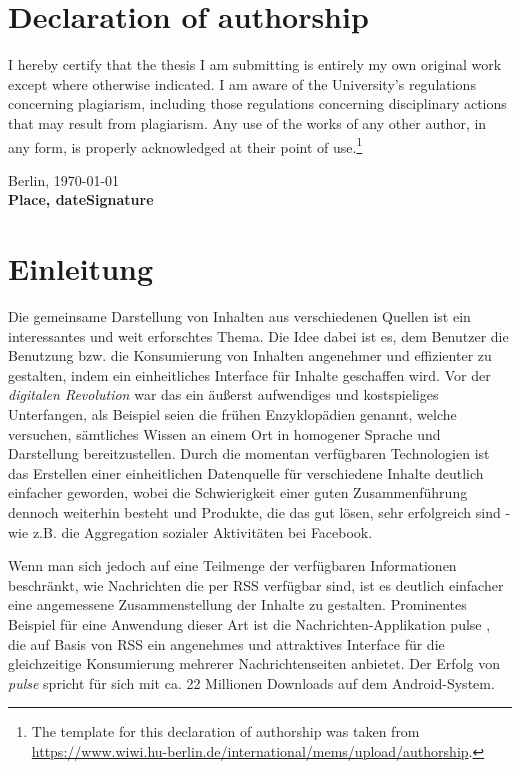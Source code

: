 \documentclass[12pt,twoside]{book}
\newcommand\blankpage{%
    \null
    \thispagestyle{empty}%
    \addtocounter{page}{-1}%
    \newpage}
\begin{document}


\chapter*{Declaration of authorship}

I hereby certify that the thesis I am submitting is entirely my own original work except where otherwise indicated. I am aware of the University's regulations concerning plagiarism, including those regulations concerning disciplinary actions that may result from plagiarism. Any use of the works of any other author, in any form, is properly acknowledged at their point of use.\footnote{The template for this declaration of authorship was taken from \url{https://www.wiwi.hu-berlin.de/international/mems/upload/authorship}.}

\vspace{2cm}

Berlin, \today\\
\textbf{Place, date}\hfill\textbf{Signature}

\tableofcontents
\newpage


\chapter{Einleitung}

Die gemeinsame Darstellung von Inhalten aus verschiedenen Quellen ist ein interessantes und weit erforschtes Thema. Die Idee dabei ist es, dem Benutzer die Benutzung bzw. die Konsumierung von Inhalten angenehmer und effizienter zu gestalten, indem ein einheitliches Interface für Inhalte geschaffen wird. Vor der \textit{digitalen Revolution} war das ein äußerst aufwendiges und kostspieliges Unterfangen, als Beispiel seien die frühen Enzyklopädien genannt, welche versuchen, sämtliches Wissen an einem Ort in homogener Sprache und Darstellung bereitzustellen. Durch die momentan verfügbaren Technologien ist das Erstellen einer einheitlichen Datenquelle für verschiedene Inhalte deutlich einfacher geworden, wobei die Schwierigkeit einer guten Zusammenführung dennoch weiterhin besteht und Produkte, die das gut lösen, sehr erfolgreich sind - wie z.B. die Aggregation sozialer Aktivitäten bei Facebook.

Wenn man sich jedoch auf eine Teilmenge der verfügbaren Informationen beschränkt, wie Nachrichten die per RSS verfügbar sind, ist es deutlich einfacher eine angemessene Zusammenstellung der Inhalte zu gestalten. Prominentes Beispiel für eine Anwendung dieser Art ist die Nachrichten-Applikation pulse \cite{pulse}, die auf Basis von RSS ein angenehmes und attraktives Interface für die gleichzeitige Konsumierung mehrerer Nachrichtenseiten anbietet. Der Erfolg von \textit{pulse} spricht für sich mit ca. 22 Millionen Downloads auf dem Android-System.
\end{document}
